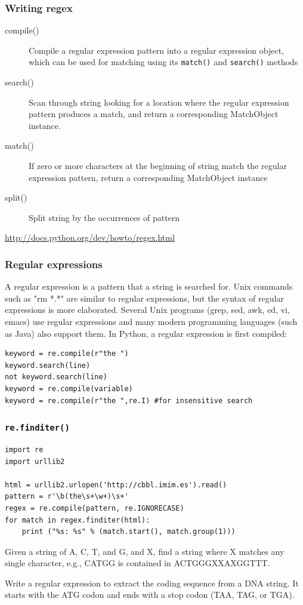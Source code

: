 \documentclass{beamer}
\begin{document}
\begin{frame}
\frametitle{Writing regex}
\begin{description}
\item[compile()] Compile a regular expression pattern into a regular expression object, which can be used for matching using its \texttt{match()} and \texttt{search()} methods
\item[search()]  Scan through string looking for a location where the regular expression pattern produces a match, and return a corresponding MatchObject instance.
\item[match()]  If zero or more characters at the beginning of string match the regular expression pattern, return a corresponding MatchObject instance
\item[split()] Split string by the occurrences of pattern 
\end{description}
\url{http://docs.python.org/dev/howto/regex.html}
\end{frame}

\begin{frame}[containsverbatim]
\frametitle{Regular expressions}
A regular expression is a pattern that a string is searched for. Unix commands such as "rm *.*" are similar to regular expressions, but the syntax of regular expressions is more elaborated. Several Unix programs (grep, sed, awk, ed, vi, emacs) use regular expressions and many modern programming languages (such as Java) also support them.
In Python, a regular expression is first compiled:
\begin{lstlisting}
keyword = re.compile(r"the ")
keyword.search(line)
not keyword.search(line)
keyword = re.compile(variable)
keyword = re.compile(r"the ",re.I) #for insensitive search
\end{lstlisting}
\end{frame}

\begin{frame}[containsverbatim]
\frametitle{\texttt{re.finditer()}}
\begin{lstlisting}
import re
import urllib2

html = urllib2.urlopen('http://cbbl.imim.es').read()
pattern = r'\b(the\s+\w+)\s+'
regex = re.compile(pattern, re.IGNORECASE)
for match in regex.finditer(html):
    print ("%s: %s" % (match.start(), match.group(1)))
\end{lstlisting}
\end{frame}

\begin{frame}
\begin{example}
Given a string of A, C, T, and G, and X, find a string where X matches any single character, e.g., CATGG is contained in ACTGGGXXAXGGTTT.
\end{example}
\begin{example}
Write a regular expression to extract the coding sequence from a DNA string. It starts with the ATG codon and ends with a stop codon (TAA, TAG, or TGA).
\end{example}
\end{frame}
\end{document}
